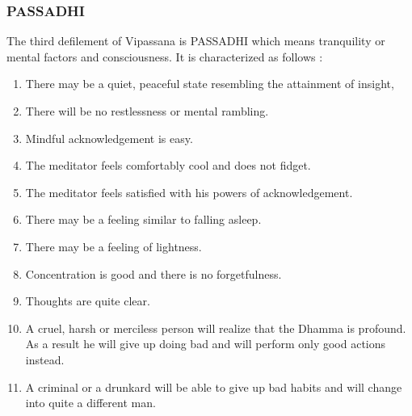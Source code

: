 \documentclass[a5paper,10pt,english]{book}
\begin{document}
\subsubsection{PASSADHI}
\label{\detokenize{progress:passadhi}}
\sphinxAtStartPar
The third defilement of Vipassana is PASSADHI which means tranquility or mental factors and consciousness. It is characterized as follows :\sphinxhyphen{}
\begin{enumerate}
%
\item {} 
\sphinxAtStartPar
There may be a quiet, peaceful state resembling the attainment of insight,

\item {} 
\sphinxAtStartPar
There will be no restlessness or mental rambling.

\item {} 
\sphinxAtStartPar
Mindful acknowledgement is easy.

\item {} 
\sphinxAtStartPar
The meditator feels comfortably cool and does not fidget.

\item {} 
\sphinxAtStartPar
The meditator feels satisfied with his powers of acknowledgement.

\item {} 
\sphinxAtStartPar
There may be a feeling similar to falling asleep.

\item {} 
\sphinxAtStartPar
There may be a feeling of lightness.

\item {} 
\sphinxAtStartPar
Concentration is good and there is no forgetfulness.

\item {} 
\sphinxAtStartPar
Thoughts are quite clear.

\item {} 
\sphinxAtStartPar
A cruel, harsh or merciless person will realize that the Dhamma is profound. As a result he will give up doing bad and will perform only good actions instead.

\item {} 
\sphinxAtStartPar
A criminal or a drunkard will be able to give up bad habits and will change into quite a different man.

\end{enumerate}
\end{document}
